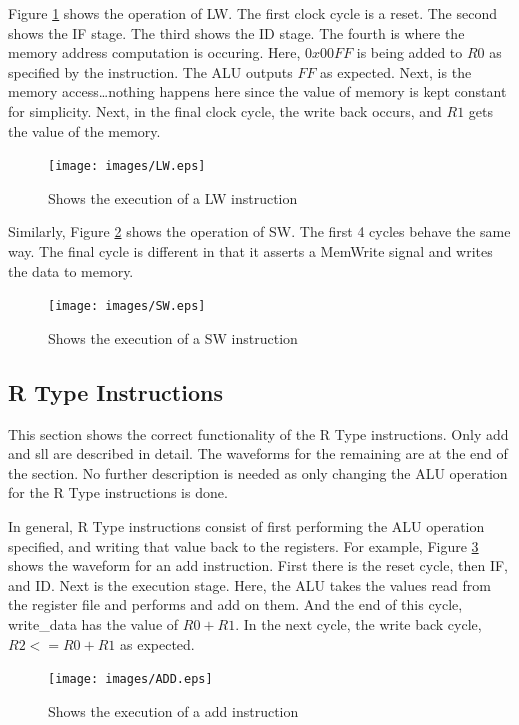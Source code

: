\documentclass[12pt, a4paper]{article}
\begin{document}
Figure \ref{fig:lw} shows the operation of LW. The first clock cycle is a reset. The second shows the IF
stage. The third shows the ID stage. The fourth is where the memory address computation is occuring. Here,
$0x00FF$ is being added to $R0$ as specified by the instruction. The ALU outputs $FF$ as expected. Next, is
the memory access\dots nothing happens here since the value of memory is kept constant for simplicity. Next,
in the final clock cycle, the write back occurs, and $R1$ gets the value of the memory.

\begin{figure}[h]
  \centering
  \texttt{[image: images/LW.eps]}
  \caption{Shows the execution of a LW instruction}
  \label{fig:lw}
\end{figure}

Similarly, Figure \ref{fig:sw} shows the operation of SW. The first 4 cycles behave the same way. The final
cycle is different in that it asserts a MemWrite signal and writes the data to memory.

\begin{figure}[h]
  \centering
  \texttt{[image: images/SW.eps]}
  \caption{Shows the execution of a SW instruction}
  \label{fig:sw}
\end{figure}

\subsection{R Type Instructions}
This section shows the correct functionality of the R Type instructions. Only add and sll
are described in detail. The waveforms for the remaining are at the end of the section. No further
description is needed as only changing the ALU operation for the R Type instructions is done.

In general, R Type instructions consist of first performing the ALU operation specified, and writing
that value back to the registers. For example, Figure \ref{fig:add} shows the waveform for an add 
instruction. First there is the reset cycle, then IF, and ID. Next is the execution stage. Here, the
ALU takes the values read from the register file and performs and add on them. And the end of this
cycle, write\_data has the value of $R0 + R1$. In the next cycle, the write back cycle,
$R2 <= R0 + R1$ as expected.

\begin{figure}[h]
  \centering
  \texttt{[image: images/ADD.eps]}
  \caption{Shows the execution of a add instruction}
  \label{fig:add}
\end{figure}
\end{document}
